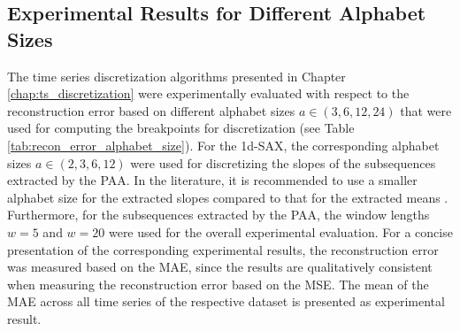 \subsection*{Experimental Results for Different Alphabet Sizes}
The time series discretization algorithms presented in Chapter \ref{chap:ts_discretization} were experimentally evaluated with respect to the reconstruction error based on different alphabet sizes $a \in (3,6,12,24)$ that were used for computing the breakpoints for discretization (see Table \ref{tab:recon_error_alphabet_size}). For the \ac{1d-SAX}, the corresponding alphabet sizes $a \in (2,3,6,12)$ were used for discretizing the slopes of the subsequences extracted by the \ac{PAA}. In the literature, it is recommended to use a smaller alphabet size for the extracted slopes compared to that for the extracted means \cite{1d-SAX}. Furthermore, for the subsequences extracted by the \ac{PAA}, the window lengths $w = 5$ and $w = 20$ were used for the overall experimental evaluation. For a concise presentation of the corresponding experimental results, the reconstruction error was measured based on the \ac{MAE}, since the results are qualitatively consistent when measuring the reconstruction error based on the \ac{MSE}. The mean of the MAE across all time series of the respective dataset is presented as experimental result.
\newpage
